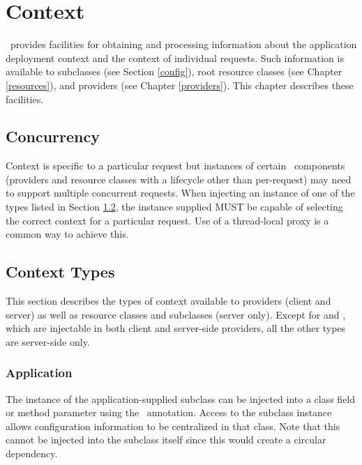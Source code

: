 \chapter{Context}
\label{context}

\jaxrs\ provides facilities for obtaining and processing information about the application deployment context and the context of individual requests. Such information is available to  subclasses (see Section \ref{config}), root resource classes (see Chapter \ref{resources}), and providers (see Chapter \ref{providers}). This chapter describes these facilities.

\section{Concurrency}

Context is specific to a particular request but instances of certain \jaxrs\ components (providers and resource classes with a lifecycle other than per-request) may need to support multiple concurrent requests. When injecting an instance of one of the types listed in Section \ref{contexttypes}, the instance supplied MUST be capable of selecting the correct context for a particular request. Use of a thread-local proxy is a common way to achieve this.

\section{Context Types}
\label{contexttypes}

This section describes the types of context available to providers (client and server) as well as resource classes and  subclasses (server only). Except for  and , which are injectable in both client and server-side providers, all the other types are server-side only.

\subsection{Application}

The instance of the application-supplied  subclass can be injected into a class field or method parameter using the \Context\ annotation. Access to the  subclass instance allows configuration information to be centralized in that class. Note that this cannot be injected into the  subclass itself since this would create a circular dependency.

